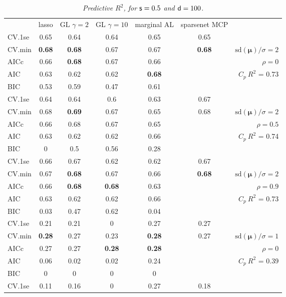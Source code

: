 \documentclass[12pt]{article}
\newcommand{\mr}[1]{\mathrm{#1}}
\newcommand{\bm}[1]{\mathbf{#1}}
\begin{document}
\begin{table}[p]\vspace{-.5cm}
\caption[l]{\label{r2}\it Predictive $R^2$, for ${\sf s}=0.5$ and  ${\sf d}=100$.}
\vspace{-.5cm}
\small{}
\begin{center}
\begin{tabular}{l*{5}{c}|r}
 & lasso & GL $\gamma=2$ & GL $\gamma=10$ & marginal AL & sparsenet MCP  &  \\
\cline{1-7}
CV.1se & 0.65 & 0.64 & 0.64 & 0.65 & 0.65 &\\
CV.min & {\bf 0.68} & {\bf 0.68} & 0.67 & 0.67 & {\bf 0.68} &  $\mr{sd}(\bm{\mu})/\sigma=2$ \\
AICc & 0.66 & {\bf 0.68} & 0.67 & 0.66 & & $\rho=0$ \\
AIC & 0.63 & 0.62 & 0.62 & {\bf 0.68} & & \multirow{2}{*}{$C_p ~ R^2$ = 0.73} \\
BIC & 0.53 & 0.59 & 0.47 & 0.61 & & \\
 \hline 
CV.1se & 0.64 & 0.64 & 0.6 & 0.63 & 0.67 &\\
CV.min & 0.68 & {\bf 0.69} & 0.67 & 0.65 & 0.68 &  $\mr{sd}(\bm{\mu})/\sigma=2$ \\
AICc & 0.66 & 0.68 & 0.67 & 0.65 & & $\rho=0.5$ \\
AIC & 0.63 & 0.62 & 0.62 & 0.66 & & \multirow{2}{*}{$C_p ~ R^2$ = 0.74} \\
BIC & 0 & 0.5 & 0.56 & 0.28 & & \\
 \hline 
CV.1se & 0.66 & 0.67 & 0.62 & 0.62 & 0.67 &\\
CV.min & 0.67 & {\bf 0.68} & 0.67 & 0.66 & {\bf 0.68} &  $\mr{sd}(\bm{\mu})/\sigma=2$ \\
AICc & 0.66 & {\bf 0.68} & {\bf 0.68} & 0.63 & & $\rho=0.9$ \\
AIC & 0.63 & 0.62 & 0.62 & 0.66 & & \multirow{2}{*}{$C_p ~ R^2$ = 0.73} \\
BIC & 0.03 & 0.47 & 0.62 & 0.04 & & \\
 \hline 
CV.1se & 0.21 & 0.21 & 0 & 0.27 & 0.27 &\\
CV.min & {\bf 0.28} & 0.27 & 0.23 & {\bf 0.28} & 0.27 &  $\mr{sd}(\bm{\mu})/\sigma=1$ \\
AICc & 0.27 & 0.27 & {\bf 0.28} & {\bf 0.28} & & $\rho=0$ \\
AIC & 0.06 & 0.02 & 0.02 & 0.24 & & \multirow{2}{*}{$C_p ~ R^2$ = 0.39} \\
BIC & 0 & 0 & 0 & 0 & & \\
 \hline 
CV.1se & 0.11 & 0.16 & 0 & 0.27 & 0.18 &\\

\end{tabular}
\end{center}
\end{table}
\end{document}
